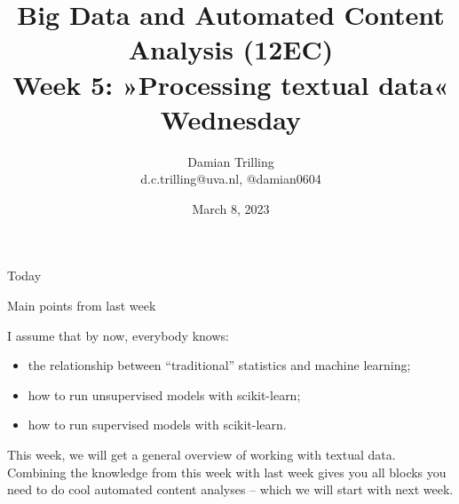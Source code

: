 

\graphicspath{{../../resources/img/}}




\title[Big Data and Automated Content Analysis]{\textbf{Big Data and Automated Content Analysis (12EC)} 
\\Week 5: »Processing textual data«
\\Wednesday}
\author[Damian Trilling]{Damian Trilling\\ \footnotesize{d.c.trilling@uva.nl, @damian0604 \\}}
\date{March 8, 2023}


\begin{frame}{}
	\titlepage
\end{frame}

\begin{frame}{Today}
	\tableofcontents
\end{frame}





\begin{frame}{Main points from last week}

\begin{alertblock}{I assume that by now, everybody knows:}
\begin{itemize}
\item the relationship between ``traditional'' statistics and machine learning;
\item how to run unsupervised models with scikit-learn;
\item how to run supervised models with scikit-learn.
\end{itemize}
\end{alertblock}
\end{frame}


\begin{frame}[standout]
This week, we will get a general overview of working with textual data. Combining the knowledge from this week with last week gives you all blocks you need to do cool automated content analyses -- which we will start with next week.
\end{frame}


















